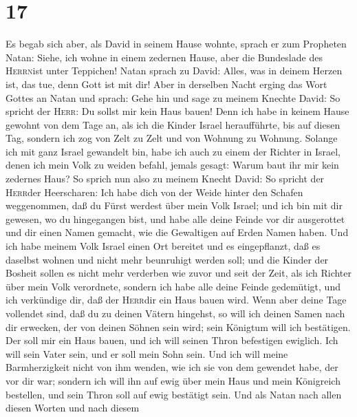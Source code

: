 \hypertarget{section-16}{%
\section{17}\label{section-16}}

 Es begab sich aber, als David in seinem Hause wohnte,
sprach er zum Propheten Natan: Siehe, ich wohne in einem zedernen Hause,
aber die Bundeslade des \textsc{Herrn}ist unter Teppichen! Natan sprach
zu David:  Alles, was in deinem Herzen ist, das tue, denn
Gott ist mit dir!  Aber in derselben Nacht erging das Wort
Gottes an Natan und sprach:  Gehe hin und sage zu meinem
Knechte David: So spricht der \textsc{Herr}: Du sollst mir kein Haus
bauen!  Denn ich habe in keinem Hause gewohnt von dem Tage
an, als ich die Kinder Israel heraufführte, bis auf diesen Tag, sondern
ich zog von Zelt zu Zelt und von Wohnung zu Wohnung. 
Solange ich mit ganz Israel gewandelt bin, habe ich auch zu einem der
Richter in Israel, denen ich mein Volk zu weiden befahl, jemals gesagt:
Warum baut ihr mir kein zedernes Haus?  So sprich nun also
zu meinem Knecht David: So spricht der \textsc{Herr}der Heerscharen: Ich
habe dich von der Weide hinter den Schafen weggenommen, daß du Fürst
werdest über mein Volk Israel;  und ich bin mit dir
gewesen, wo du hingegangen bist, und habe alle deine Feinde vor dir
ausgerottet und dir einen Namen gemacht, wie die Gewaltigen auf Erden
Namen haben.  Und ich habe meinem Volk Israel einen Ort
bereitet und es eingepflanzt, daß es daselbst wohnen und nicht mehr
beunruhigt werden soll; und die Kinder der Bosheit sollen es nicht mehr
verderben wie zuvor und seit der Zeit, als ich Richter über mein Volk
verordnete,  sondern ich habe alle deine Feinde
gedemütigt, und ich verkündige dir, daß der \textsc{Herr}dir ein Haus
bauen wird.  Wenn aber deine Tage vollendet sind, daß du
zu deinen Vätern hingehst, so will ich deinen Samen nach dir erwecken,
der von deinen Söhnen sein wird; sein Königtum will ich bestätigen.
 Der soll mir ein Haus bauen, und ich will seinen Thron
befestigen ewiglich.  Ich will sein Vater sein, und er
soll mein Sohn sein. Und ich will meine Barmherzigkeit nicht von ihm
wenden, wie ich sie von dem gewendet habe, der vor dir war;
 sondern ich will ihn auf ewig über mein Haus und mein
Königreich bestellen, und sein Thron soll auf ewig bestätigt sein.
 Und als Natan nach allen diesen Worten und nach diesem

